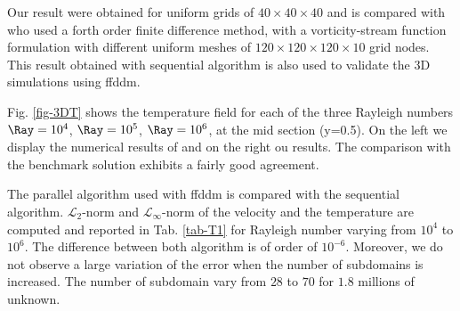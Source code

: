 Our result were obtained for uniform grids of $  40 \times 40 \times 40$ and is compared with \cite{Wakashima-2004} who used a forth order finite difference method, with a vorticity-stream function formulation with different uniform meshes of  $120 \times 120 \times 120 \times 10$ grid nodes. 
This result obtained with sequential algorithm is also used to validate the 3D simulations using ffddm.

Fig. \ref{fig-3DT} shows the temperature field for each of the three Rayleigh numbers $\Ray = 10^4$, $\Ray = 10^5$, $\Ray = 10^6$, at the mid section (y=0.5).
On the left we display the numerical results of \cite{Wakashima-2004} and on the right ou results.
The comparison with the benchmark solution exhibits a fairly good agreement.

The parallel algorithm used with ffddm is compared with the sequential algorithm.
$\mathcal{L}_2$-norm and $\mathcal{L}_\infty$-norm of the velocity and the temperature are computed and reported in Tab. \ref{tab-T1} for Rayleigh number varying from $10^4$ to $10^6$.
The difference between both algorithm is of order of $10^{-6}$.
Moreover, we do not observe a large variation of the error when the number of subdomains is increased.
The number of subdomain vary from $28$ to $70$ for $1.8$ millions of unknown.

